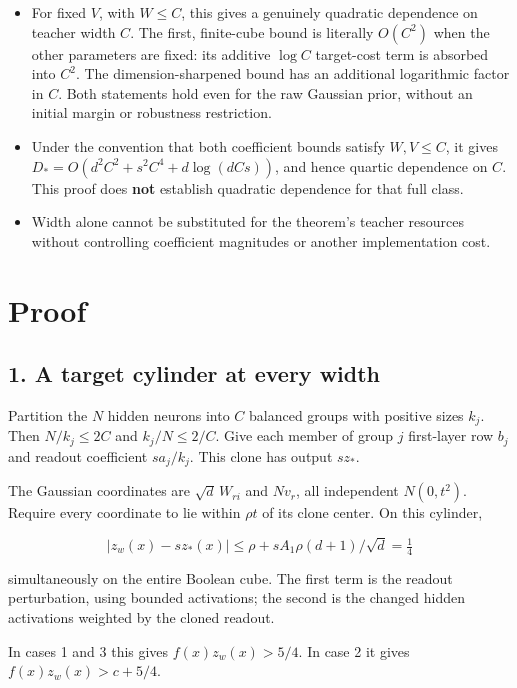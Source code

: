 \documentclass[11pt]{article}
\providecommand{\tightlist}{\setlength{\itemsep}{0pt}\setlength{\parskip}{0pt}}
\begin{document}
\begin{itemize}
\tightlist
\item
  For fixed \(V\), with \(W\le C\), this gives a genuinely quadratic
  dependence on teacher width \(C\). The first, finite-cube bound is
  literally \(O(C^2)\) when the other parameters are fixed: its additive
  \(\log C\) target-cost term is absorbed into \(C^2\). The
  dimension-sharpened bound has an additional logarithmic factor in
  \(C\). Both statements hold even for the raw Gaussian prior, without
  an initial margin or robustness restriction.
\item
  Under the convention that both coefficient bounds satisfy \(W,V\le C\),
  it gives \(D_*=O(d^2C^2+s^2C^4+d\log(dCs))\), and hence quartic
  dependence on \(C\). This proof does \textbf{not} establish quadratic
  dependence for that full class.
\item
  Width alone cannot be substituted for the theorem's teacher resources
  without controlling coefficient magnitudes or another implementation
  cost.
\end{itemize}

\section{Proof}\label{proof}

\subsection{1. A target cylinder at every
width}\label{a-target-cylinder-at-every-width}

Partition the \(N\) hidden neurons into \(C\) balanced groups with
positive sizes \(k_j\). Then \(N/k_j\le2C\) and \(k_j/N\le2/C\). Give
each member of group \(j\) first-layer row \(b_j\) and readout
coefficient \(sa_j/k_j\). This clone has output \(sz_*\).

The Gaussian coordinates are \(\sqrt d\,W_{ri}\) and \(Nv_r\), all
independent \(N(0,t^2)\). Require every coordinate to lie within
\(\rho t\) of its clone center. On this cylinder,

\[
|z_w(x)-sz_*(x)|
\le \rho+sA_1\rho(d+1)/\sqrt d=\tfrac14
\]

simultaneously on the entire Boolean cube. The first term is the readout
perturbation, using bounded activations; the second is the changed
hidden activations weighted by the cloned readout.

In cases 1 and 3 this gives \(f(x)z_w(x)>5/4\). In case 2 it gives
\(f(x)z_w(x)>c+5/4\).
\end{document}
